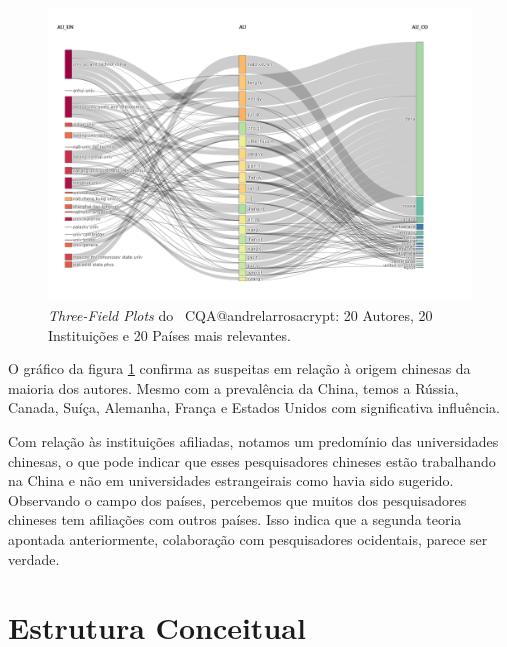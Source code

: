 \begin{figure}
    \centering
    \includegraphics[angle=0,width=1\textwidth]{experiments/andrelarrosacrypt/AnaliseBibliometrica/CriptografiaQuantica/imagens/CQA@andrelarrosacrypt_Aut_Aff_Coun.png}
    \caption{\textit{Three-Field Plots} do \dataset\ CQA@andrelarrosacrypt: 20 Autores, 20 Instituições e 20 Países mais relevantes.}
    \label{CQA@andrelarrosacrypt_Aut_Aff_Coun}
\end{figure}


O gráfico da figura \ref{CQA@andrelarrosacrypt_Aut_Aff_Coun} confirma as suspeitas em relação à origem chinesas da maioria dos autores. Mesmo com a prevalência da China, temos a Rússia, Canada, Suíça, Alemanha, França e Estados Unidos com significativa influência.

Com relação às instituições afiliadas, notamos um predomínio das universidades chinesas, o que pode indicar que esses pesquisadores chineses estão trabalhando na China e não em universidades estrangeirais como havia sido sugerido. Observando o campo dos países, percebemos que muitos dos pesquisadores chineses tem afiliações com outros países. Isso indica que a segunda teoria apontada anteriormente, colaboração com pesquisadores ocidentais, parece ser verdade.

\section{Estrutura Conceitual}


